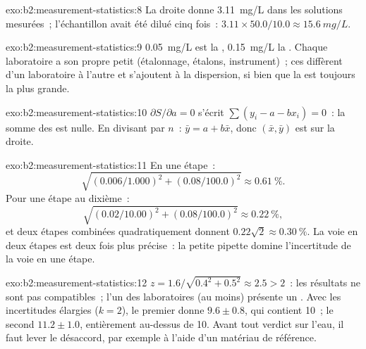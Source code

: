 \begin{solution}{exo:b2:measurement-statistics:8}
La droite donne \qty{3.11}{mg/L} dans les solutions mesurées~; l'échantillon avait été dilué cinq fois~:
$3.11 \times 50.0/10.0 \approx \qty{15.6}{mg/L}$.
\end{solution}

\begin{solution}{exo:b2:measurement-statistics:9}
\qty{0.05}{mg/L} est la , \qty{0.15}{mg/L} la . Chaque laboratoire a son
propre petit  (étalonnage, étalons, instrument)~; ces  diffèrent d'un laboratoire à l'autre et
s'ajoutent à la dispersion, si bien que la  est toujours la plus grande.
\end{solution}

\begin{solution}{exo:b2:measurement-statistics:10}
$\partial S/\partial a = 0$ s'écrit $\sum(y_i - a - bx_i) = 0$~: la somme des  est nulle. En
divisant par
$n$~: $\bar y = a + b\bar x$, donc $(\bar x, \bar y)$ est sur la droite.
\end{solution}

\begin{solution}{exo:b2:measurement-statistics:11}
En une étape~:
\[\sqrt{(0.006/1.000)^2 + (0.08/100.0)^2} \approx 0.61~\%.\]
Pour une étape au dixième~:
\[\sqrt{(0.02/10.00)^2 + (0.08/100.0)^2} \approx 0.22~\%,\]
et deux étapes combinées quadratiquement donnent $0.22\sqrt2 \approx 0.30~\%$. La voie en deux étapes est
deux fois plus précise~: la petite pipette domine l'incertitude de la voie en une étape.
\end{solution}

\begin{solution}{exo:b2:measurement-statistics:12}
$z = 1.6/\sqrt{0.4^2 + 0.5^2} \approx 2.5 > 2$~: les résultats ne sont pas compatibles~; l'un des
laboratoires (au moins) présente un . Avec les incertitudes élargies ($k = 2$), le premier donne
$9.6 \pm 0.8$, qui contient 10~; le second
$11.2 \pm 1.0$, entièrement au-dessus de 10. Avant tout verdict sur l'eau, il faut lever le désaccord,
par exemple à l'aide d'un matériau de référence.
\end{solution}

